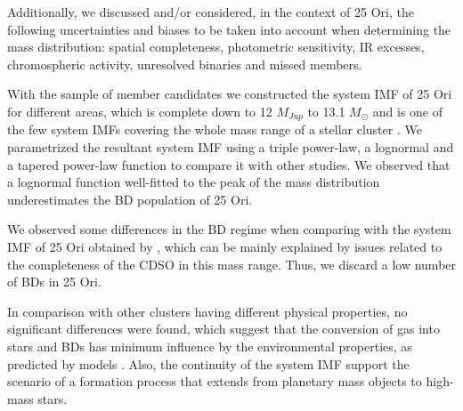 \documentclass[12pt]{article}
\begin{document}
Additionally, we discussed and/or considered, in the context of 25 Ori, the following uncertainties and biases to be taken into account when determining the mass distribution: spatial completeness, photometric sensitivity, IR excesses, chromospheric activity, unresolved binaries and missed members.

With the sample of member candidates we constructed the system IMF of 25 Ori for different areas, which is complete down to 12 $M_{Jup}$ to 13.1 $M_\odot$ and is one of the few system IMFs covering the whole mass range of a stellar cluster \citep[e.g. the $\sigma$ Ori system IMF by ][]{PenaRamirez2012}. We parametrized the resultant system IMF using a triple power-law, a lognormal and a tapered power-law function to compare it with other studies. We observed that a lognormal function well-fitted to the peak of the mass distribution underestimates the BD population of 25 Ori.

We observed some differences in the BD regime when comparing with the system IMF of 25 Ori obtained by \citet{Downes2014}, which can be mainly explained by issues related to the completeness of the CDSO in this mass range. Thus, we discard a low number of BDs in 25 Ori.

In comparison with other clusters having different physical properties, no significant differences were found, which suggest that the conversion of gas into stars and BDs has minimum influence by the environmental properties, as predicted by models \citep[e.g. ][]{Bonnell2006,Elmegreen2008}. Also, the continuity of the system IMF support the scenario of a formation process that extends from planetary mass objects to high-mass stars.
\end{document}
